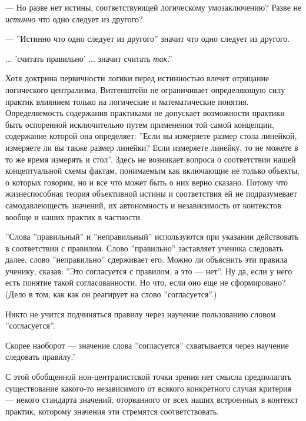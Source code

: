 \documentclass[11pt]{book}
\begin{document}
--- Но разве нет истины, соответствующей логическому умозаключению? Разве не \textit{истинно} что одно следует из другого?

--- ''Истинно что одно следует из другого'' значит что одно следует из другого.

... 'считать правильно' ... значит считать \textit{так}.''

\relax
{}\relax
\smallskip

Хотя доктрина первичности логики перед истинностью влечет отрицание логического централизма, Витгенштейн не ограничивает определяющую силу практик влиянием только на логические и математические понятия. Определяемость содержания практиками не допускает возможности практики быть оспоренной исключительно путем применения той самой концепции, содержание которой она определяет: ''Если вы измеряете размер стола линейкой, измеряете ли вы также размер линейки? Если измеряете линейку, то не можете в то же время измерять и стол''. Здесь не возникает вопроса о соответствии нашей концептуальной схемы фактам, понимаемым как включающие не только объекты, о которых говорим, но и все что может быть о них верно сказано. Потому что жизнеспособная теория объективной истины и соответствия ей не подразумевает самодавлеющесть значений, их автономность и независимость от контекстов вообще и наших практик в частности.

\smallskip
{}\relax
{}\relax

''Слова ''правильный'' и ''неправильный'' используются при указании действовать в соответствии с правилом. Слово ''правильно'' заставляет ученика следовать далее, слово ''неправильно'' сдерживает его. Можно ли объяснить эти правила ученику, сказав: ''Это согласуется с правилом, а это --- нет''. Ну да, если у него есть понятие такой согласованности. Но что, если оно еще не сформировано? (Дело в том, как как он реагирует на слово ''согласуется''.)

Никто не учится подчиняться правилу через научение пользованию словом ''согласуется''.

Скорее наоборот --- значение слова ''согласуется'' схватывается через научение следовать правилу.''

\relax
{}\relax
\smallskip

С этой обобщенной нон-централистской точки зрения нет смысла предполагать существование какого-то независимого от всякого конкретного случая критерия --- некого стандарта значений, оторванного от всех наших встроенных в контекст практик, которому значения эти стремятся соответствовать.
\end{document}
